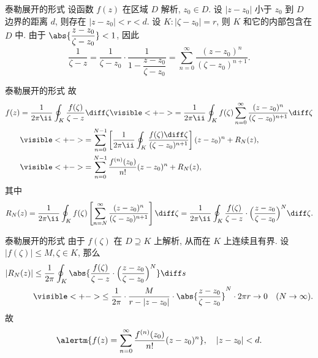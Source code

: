 \begin{frame}{泰勒展开的形式}
	\onslide<+->
	设函数 $f(z)$ 在区域 $D$ 解析, $z_0\in D$.
	\onslide<+->
	设 $|z-z_0|$ 小于 $z_0$ 到 $D$ 边界的距离 $d$,
	则存在 $|z-z_0|<r<d$.
	\onslide<+->
	设 $K:|\zeta-z_0|=r$, 则 $K$ 和它的内部包含在 $D$ 中.
	\onslide<+->
	由于 $\abs{\dfrac{z-z_0}{\zeta-z_0}}<1$, 因此
	\[\frac1{\zeta-z}=\frac1{\zeta-z_0}\cdot\frac1{1-\dfrac{z-z_0}{\zeta-z_0}}=\sum_{n=0}^\infty\frac{(z-z_0)^n}{(\zeta-z_0)^{n+1}}.
	\]

	\begin{center}
	\end{center}
\end{frame}


\begin{frame}{泰勒展开的形式}
	\onslide<+->
	故
	\begin{align*}
		f(z)&=\frac1{2\pi\ii}\oint_K \frac{f(\zeta)}{\zeta-z}\diff\zeta
		\visible<+->{=\frac1{2\pi\ii}\oint_K f(\zeta)\sum_{n=0}^\infty\frac{(z-z_0)^n}{(\zeta-z_0)^{n+1}}\diff\zeta}\\
		&\visible<+->{=
		\sum_{n=0}^{N-1}\left[\frac1{2\pi\ii}\oint_K\frac{f(\zeta)\diff\zeta}{(\zeta-z_0)^{n+1}}\right](z-z_0)^n+R_N(z),}\\
		&\visible<+->{=
		\sum_{n=0}^{N-1}\frac{f^{(n)}(z_0)}{n!}(z-z_0)^n+R_N(z),}
	\end{align*}
	\onslide<+->
	其中
	\[
		R_N(z)=\frac1{2\pi\ii}\oint_Kf(\zeta)\left[\sum_{n=N}^\infty\frac{(z-z_0)^n}{(\zeta-z_0)^{n+1}}\right]\diff\zeta
		=\frac1{2\pi\ii}\oint_K\frac{f(\zeta)}{\zeta-z}\cdot\Bigl(\frac{z-z_0}{\zeta-z_0}\Bigr)^N\diff\zeta.
	\]
\end{frame}


\begin{frame}{泰勒展开的形式}
	\onslide<+->
	由于 $f(\zeta)$ 在 $D\supseteq K$ 上解析, 从而在 $K$ 上连续且有界.
	\onslide<+->
	设 $|f(\zeta)|\le M,\zeta\in K$,
	\onslide<+->
	那么
	\begin{align*}
		|R_N(z)|&\le\frac 1{2\pi}\oint_K\abs{\frac{f(\zeta)}{\zeta-z}\cdot\Bigl(\frac{z-z_0}{\zeta-z_0}\Bigr)^N}\diff s\\
		&\visible<+->{\le\frac 1{2\pi}\cdot \frac M{r-|z-z_0|}\cdot\abs{\frac{z-z_0}{\zeta-z_0}}^N\cdot 2\pi r\to 0\quad (N\to\infty).}
	\end{align*}
	\onslide<+->
	故
	\[\alertm{f(z)=\sum_{n=0}^\infty\frac{f^{(n)}(z_0)}{n!}(z-z_0)^n},\quad |z-z_0|<d.
	\]
\end{frame}


